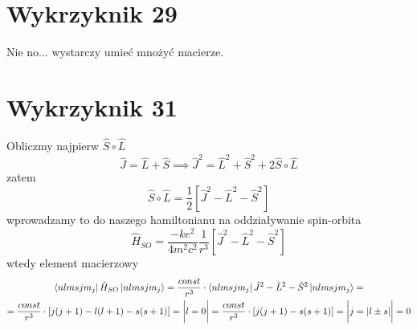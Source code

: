 \documentclass[a4paper,12pt]{article}
\begin{document}
\section{Wykrzyknik 29}
	Nie no... wystarczy umieć mnożyć macierze.
\section{Wykrzyknik 31}
 	Obliczmy najpierw $\hat{S}\circ\hat{L}$ 
 		$$
 		\hat{J}= \hat{L}+\hat{S} \implies \hat{J}^2 = \hat{L}^2+\hat{S}^2 + 2\hat{S}\circ\hat{L}
 		$$
 	zatem
 		$$
 		\hat{S}\circ\hat{L}=\frac{1}{2}\left[\hat{J}^2-\hat{L}^2-\hat{S}^2 \right]
 		$$
 	wprowadzamy to do naszego hamiltonianu na oddziaływanie spin-orbita 
 		$$
 		\hat{H}_{SO} = \frac{-ke^2}{4m^2c^2}\frac{1}{r^3}\left[\hat{J}^2-\hat{L}^2-\hat{S}^2 \right]
 		$$
 	wtedy element macierzowy
 		$$
 		\begin{gathered}
 			\bra{nlmsjm_j}\hat{H}_{SO}\ket{nlmsjm_j} = \frac{const}{r^3}\cdot\bra{nlmsjm_j}\hat{J}^2-\hat{L}^2-\hat{S}^2\ket{nlmsjm_j} = \\ =\frac{const}{r^3}\cdot\left[j(j+1) - l(l+1)-s(s+1)\right] = \bigg\vert l = 0\bigg\vert = \frac{const}{r^3}\cdot\left[j(j+1) -s(s+1)\right] = \bigg\vert j = |l\pm s| \bigg\vert = 0
 		\end{gathered}
 		$$
\end{document}
